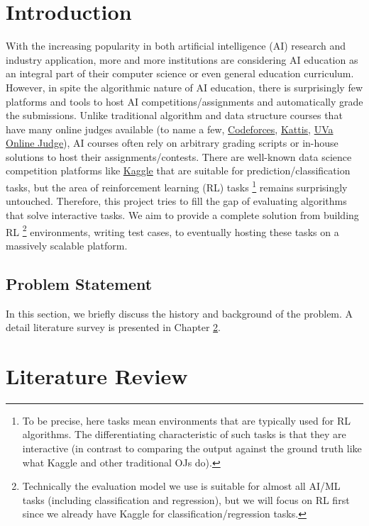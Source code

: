 \documentclass[fyp]{socreport}
\begin{document}
\chapter{Introduction}
With the increasing popularity in both artificial intelligence (AI) research and industry application, more and more institutions are considering AI education as an integral part of their computer science or even general education curriculum. However, in spite the algorithmic nature of AI education, there is surprisingly few platforms and tools to host AI competitions/assignments and automatically grade the submissions. Unlike traditional algorithm and data structure courses that have many online judges available (to name a few, \href{https://codeforces.com/}{Codeforces}, \href{https://open.kattis.com/}{Kattis}, \href{https://onlinejudge.org/}{UVa Online Judge}), AI courses often rely on arbitrary grading scripts or in-house solutions to host their assignments/contests. There are well-known data science competition platforms like \href{https://www.kaggle.com/}{Kaggle} that are suitable for prediction/classification tasks, but the area of reinforcement learning (RL) tasks \footnote{To be precise, here tasks mean environments that are typically used for RL algorithms. The differentiating characteristic of such tasks is that they are interactive (in contrast to comparing the output against the ground truth like what Kaggle and other traditional OJs do).} remains surprisingly untouched. Therefore, this project tries to fill the gap of evaluating algorithms that solve interactive tasks. We aim to provide a complete solution from building RL \footnote{Technically the evaluation model we use is suitable for almost all AI/ML tasks (including classification and regression), but we will focus on RL first since we already have Kaggle for classification/regression tasks.} environments, writing test cases, to eventually hosting these tasks on a massively scalable platform.

\section{Problem Statement}
In this section, we briefly discuss the history and background
of the problem.  A detail literature survey is presented in 
Chapter \ref{ch:related}.

\chapter{Literature Review}
\label{ch:related}
\end{document}
